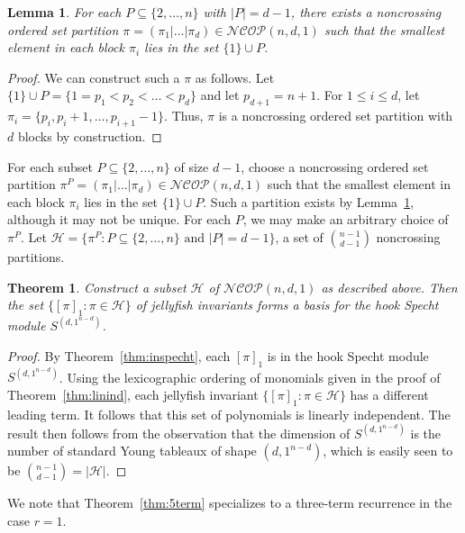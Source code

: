 \documentclass[10pt]{amsart}
\theoremstyle{definition}
\theoremstyle{plain}
\newtheorem{lemma}[cdrthm]{Lemma}
\theoremstyle{plain}
\theoremstyle{definition}
\theoremstyle{remark}
\theoremstyle{plain}
\newtheorem{theorem}[cdrthm]{Theorem}
\theoremstyle{plain}
\theoremstyle{plain}
\numberwithin{equation}{section}
\newcommand{\ncop}{\mathcal{NCOP}}
\begin{document}
\begin{lemma}\label{lem:r=1_exists}
For each $P\subseteq \{2,\ldots,n\}$ with $|P| = d-1$, there exists a noncrossing ordered set partition $\pi = (\pi_1| \dots | \pi_d) \in \ncop(n,d,1)$ such that the smallest element in each block $\pi_i$ lies in the set $\{1\}\cup P$.
\end{lemma}
\begin{proof}
We can construct such a $\pi$ as follows. Let $\{1\}\cup P = \{1 = p_1 < p_2 < \dots < p_d \}$ and let $p_{d+1} = n+1$. For $1 \leq i \leq d$, let $\pi_i = \{p_{i}, p_i + 1, \dots, p_{i+1} - 1 \}$. Thus, $\pi$ is a noncrossing ordered set partition with $d$ blocks by construction.
\end{proof}

For each subset $P \subseteq \{2,\ldots,n\}$ of size $d-1$, choose a noncrossing ordered set partition $\pi^P = (\pi_1 | \dots | \pi_d) \in \ncop(n,d,1)$ such that the smallest element in each block $\pi_i$ lies in the set $\{1\}\cup P$. Such a partition exists by Lemma~\ref{lem:r=1_exists}, although it may not be unique. For each $P$, we may make an arbitrary choice of $\pi^P$. Let $\mathcal{H}  = \{\pi^P : P \subseteq \{2,\ldots,n\} \text{ and } |P| = d-1 \}$, a set of $\binom{n-1}{d-1}$ noncrossing partitions.

\begin{theorem}\label{theorem:requals1}
Construct a subset $\mathcal{H}$ of $\ncop(n,d,1)$ as described above. Then the set $\{[\pi]_1 : \pi \in \mathcal{H}\}$ of jellyfish invariants forms a basis for the hook Specht module $S^{(d,1^{n-d})}$. 
\end{theorem}
\begin{proof}
By Theorem~\ref{thm:inspecht}, each $[\pi]_1$ is in the hook Specht module $S^{(d,1^{n-d})}$. Using the lexicographic ordering of monomials given in the proof of Theorem~\ref{thm:linind}, each jellyfish invariant $\{[\pi]_1 : \pi\in\mathcal{H}\}$ has a different leading term. It follows that this set of polynomials is linearly independent. The result then follows from the observation that the dimension of $S^{(d,1^{n-d})}$ is the number of standard Young tableaux of shape $(d,1^{n-d})$, which is easily seen to be $\binom{n-1}{d-1}=|\mathcal{H}|$.
\end{proof}

We note that Theorem~\ref{thm:5term} specializes to a three-term recurrence in the case $r=1$. 
\end{document}
